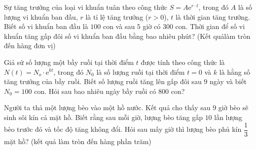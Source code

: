 \begin{ex}%
	Sự tăng trưởng của loại vi khuẩn tuân theo công thức $S=A\mathrm{e}^{r\cdot t}$, trong đó $A$ là số lượng vi khuẩn ban đầu, $r$ là tỉ lệ tăng trưởng ($r>0$), $t$ là thời gian tăng trưởng. Biết số vi khuẩn ban đầu là  $100$ con và sau $5$ giờ có $300$ con. Thời gian để số vi khuẩn tăng gấp đôi số vi khuẩn ban đầu bằng bao nhiêu phút? (Kết quảlàm tròn đến hàng đơn vị)
\end{ex}

\begin{ex}%
	Giả sử số lượng một bầy ruồi tại thời điểm $t$ được tính theo công thức là $N(t)=N_o\cdot\mathrm{e}^{kt}$, trong đó $N_0$ là số lượng ruồi tại thời điểm $t=0$ và $k$ là hằng số tăng trưởng của bầy ruồi. Biết  số lượng ruồi tăng lên gấp đôi sau $9$ ngày và biết $N_0=100$ con. Hỏi sau bao nhiêu ngày bầy ruồi có $800$ con?
\end{ex}

\begin{ex}%
	Người ta thả một lượng bèo vào một hồ nước. Kết quả cho thấy sau $9$ giờ bèo sẽ sinh sôi kín cả mặt hồ. Biết rằng sau mỗi giờ, lượng bèo tăng gấp $10$ lần lượng bèo trước đó và tốc độ tăng không đổi. Hỏi sau mấy giờ thì lượng bèo  phủ kín $\dfrac{1}{3}$ mặt hồ? (kết quả làm tròn đến hàng phần trăm)
\end{ex}

